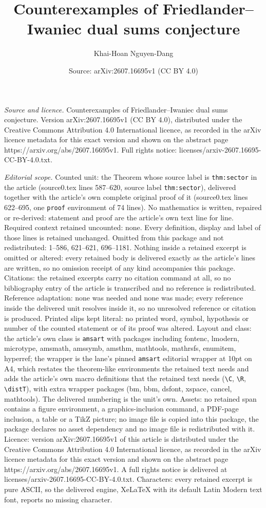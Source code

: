 \documentclass[10pt,a4paper]{amsart}
\title[Counterexamples of Friedlander--Iwaniec dual sums conjecture]{Counterexamples of Friedlander--Iwaniec dual sums conjecture}
\author{Khai-Hoan Nguyen-Dang}
\date{Source: arXiv:2607.16695v1 (CC BY 4.0)}
\begin{document}
\maketitle

\noindent\emph{Source and licence.} Counterexamples of Friedlander--Iwaniec dual sums conjecture. Version arXiv:2607.16695v1 (CC BY 4.0), distributed under the Creative Commons Attribution 4.0 International licence, as recorded in the arXiv licence metadata for this exact version and shown on the abstract page https://arxiv.org/abs/2607.16695v1. Full rights notice: licenses/arxiv-2607.16695-CC-BY-4.0.txt.\par\smallskip

\noindent\textit{Editorial scope.} Counted unit: the Theorem whose source label is \texttt{thm:sector} in the article (source0.tex lines 587--620, source label \texttt{thm:sector}), delivered together with the article's own complete original proof of it (source0.tex lines 622--695, one \texttt{proof} environment of 74 lines). No mathematics is written, repaired or re-derived: statement and proof are the article's own text line for line. Required context retained uncounted: none. Every definition, display and label of those lines is retained unchanged. Omitted from this package and not redistributed: 1--586, 621--621, 696--1181. Nothing inside a retained excerpt is omitted or altered: every retained body is delivered exactly as the article's lines are written, so no omission receipt of any kind accompanies this package. Citations: the retained excerpts carry no citation command at all, so no bibliography entry of the article is transcribed and no reference is redistributed. Reference adaptation: none was needed and none was made; every reference inside the delivered unit resolves inside it, so no unresolved reference or citation is produced. Printed slips kept literal: no printed word, symbol, hypothesis or number of the counted statement or of its proof was altered. Layout and class: the article's own class is \texttt{amsart} with packages including fontenc, lmodern, microtype, amsmath, amssymb, amsthm, mathtools, mathrsfs, enumitem, hyperref; the wrapper is the lane's pinned \texttt{amsart} editorial wrapper at 10pt on A4, which restates the theorem-like environments the retained text needs and adds the article's own macro definitions that the retained text needs (\texttt{\textbackslash C}, \texttt{\textbackslash R}, \texttt{\textbackslash distT}), with extra wrapper packages (bm, bbm, dsfont, xspace, cancel, mathtools). The delivered numbering is the unit's own. Assets: no retained span contains a figure environment, a graphics-inclusion command, a PDF-page inclusion, a table or a TikZ picture; no image file is copied into this package, the package declares no asset dependency and no image file is redistributed with it. Licence: version arXiv:2607.16695v1 of this article is distributed under the Creative Commons Attribution 4.0 International licence, as recorded in the arXiv licence metadata for this exact version and shown on the abstract page https://arxiv.org/abs/2607.16695v1. A full rights notice is delivered at licenses/arxiv-2607.16695-CC-BY-4.0.txt. Characters: every retained excerpt is pure ASCII, so the delivered engine, XeLaTeX with its default Latin Modern text font, reports no missing character.
\end{document}
